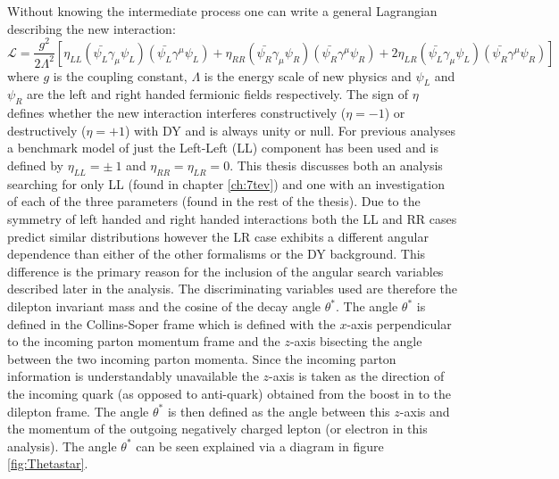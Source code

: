         Without knowing the intermediate process one can write a general Lagrangian describing the new interaction:
        \begin{equation}
            \mathcal{L} = \frac{g^{2}}{2\Lambda^{2}}
                [\eta_{LL} (\bar{\psi_{L}}\gamma_{\mu}\psi_{L}) (\bar{\psi_{L}}\gamma^{\mu}\psi_{L}) 
                + \eta_{RR} (\bar{\psi_{R}}\gamma_{\mu}\psi_{R}) (\bar{\psi_{R}}\gamma^{\mu}\psi_{R}) 
                + 2\eta_{LR} (\bar{\psi_{L}}\gamma_{\mu}\psi_{L}) (\bar{\psi_{R}}\gamma^{\mu}\psi_{R}) ]
        \end{equation}
        where $g$ is the coupling constant, $\Lambda$ is the energy scale of new physics and $\psi_{L}$ and $\psi_{R}$ are the left and right handed fermionic fields respectively. The sign of $\eta$ defines whether the new interaction interferes constructively ($\eta = -1$) or destructively ($\eta = +1$) with DY and is always unity or null. For previous analyses \cite{PhysRevLett.103.191803,PhysRevLett.96.211801,PhysRevD.87.015010} a benchmark model of just the Left-Left (LL) component has been used and is defined by $\eta_{LL} = \pm~1$ and $\eta_{RR} = \eta_{LR} = 0$. This thesis discusses both an analysis searching for only LL (found in chapter \ref{ch:7tev}) and one with an investigation of each of the three parameters (found in the rest of the thesis). Due to the symmetry of left handed and right handed interactions both the LL and RR cases predict similar distributions however the LR case exhibits a different angular dependence than either of the other formalisms or the DY background. This difference is the primary reason for the inclusion of the angular search variables described later in the analysis. The discriminating variables used are therefore the dilepton invariant mass and the cosine of the decay angle $\theta^{*}$. The angle $\theta^{*}$ is defined in the Collins-Soper frame \cite{PhysRevD.16.2219} which is defined with the $x$-axis perpendicular to the incoming parton momentum frame and the $z$-axis bisecting the angle between the two incoming parton momenta. Since the incoming parton information is understandably unavailable the $z$-axis is taken as the direction of the incoming quark (as opposed to anti-quark) obtained from the boost in to the dilepton frame. The angle $\theta^{*}$ is then defined as the angle between this $z$-axis and the momentum of the outgoing negatively charged lepton (or electron in this analysis). The angle $\theta^{*}$ can be seen explained via a diagram in figure \ref{fig:Thetastar}.

